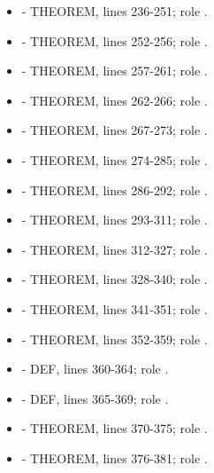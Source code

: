 \begin{itemize}
  \texttt{\protect{}}.
\item
  \texttt{\protect{}} - THEOREM, lines 236-251; role
  \texttt{\protect{}}.
\item
  \texttt{\protect{}} - THEOREM, lines 252-256; role
  \texttt{\protect{}}.
\item
  \texttt{\protect{}} - THEOREM, lines 257-261; role
  \texttt{\protect{}}.
\item
  \texttt{\protect{}} - THEOREM, lines 262-266; role
  \texttt{\protect{}}.
\item
  \texttt{\protect{}} - THEOREM, lines 267-273; role
  \texttt{\protect{}}.
\item
  \texttt{\protect{}} - THEOREM, lines 274-285; role \texttt{\protect{}}.
\item
  \texttt{\protect{}} - THEOREM, lines 286-292; role \texttt{\protect{}}.
\item
  \texttt{\protect{}} - THEOREM, lines 293-311; role
  \texttt{\protect{}}.
\item
  \texttt{\protect{}} - THEOREM, lines 312-327; role
  \texttt{\protect{}}.
\item
  \texttt{\protect{}} - THEOREM, lines 328-340;
  role \texttt{\protect{}}.
\item
  \texttt{\protect{}} - THEOREM, lines 341-351; role
  \texttt{\protect{}}.
\item
  \texttt{\protect{}} - THEOREM, lines 352-359; role
  \texttt{\protect{}}.
\item
  \texttt{\protect{}} - DEF, lines 360-364; role \texttt{\protect{}}.
\item
  \texttt{\protect{}} - DEF, lines 365-369; role \texttt{\protect{}}.
\item
  \texttt{\protect{}} - THEOREM, lines 370-375; role
  \texttt{\protect{}}.
\item
  \texttt{\protect{}} - THEOREM, lines 376-381; role \texttt{\protect{}}.

\end{itemize}
